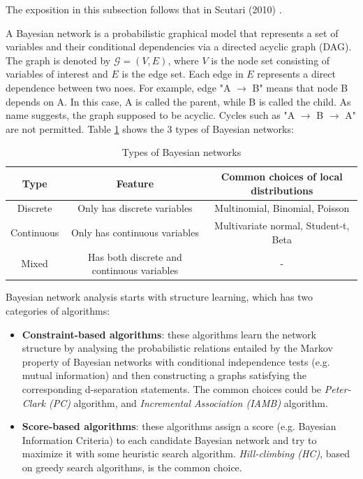 \documentclass[11pt,twoside]{article}
\numberwithin{Theorem}{section}
\numberwithin{Definition}{section}
\numberwithin{Lemma}{section}
\numberwithin{Algorithm}{section}
\numberwithin{equation}{section}
\begin{document}
The exposition in this subsection follows that in Scutari (2010) \cite{scutari2010learning}.

A Bayesian network is a probabilistic graphical model that represents a set of variables and their conditional dependencies via a directed acyclic graph (DAG). The graph is denoted by $\mathcal{G} = (V,E)$, where $V$ is the node set consisting of variables of interest and $E$ is the edge set. Each edge in $E$ represents a direct dependence between two noes.  For example, edge "A $\rightarrow$ B" means that node B depends on A. In this case, A is called the parent, while B is called the child. As name suggests, the graph supposed to be acyclic. Cycles such as "A $\rightarrow$ B $\rightarrow$ A" are not permitted. Table \ref{tab:bn_type} shows the 3 types of Bayesian networks:

\begin{table}[!h]
	\centering
	\begin{tabular}{|c|c|c|}
		\hline
		Type & Feature & Common choices of local distributions \\
		\hline
		Discrete & Only has discrete variables & Multinomial, Binomial, Poisson \\
		Continuous & Only has continuous variables & Multivariate normal, Student-t, Beta \\
		Mixed & Has both discrete and continuous variables & - \\
		\hline
	\end{tabular}
	\caption{Types of Bayesian networks}
	\label{tab:bn_type} 
\end{table}

Bayesian network analysis starts with structure learning, which has two categories of algorithms:
\begin{itemize}

\item \textbf{Constraint-based algorithms}: these algorithms learn the network structure by analysing the probabilistic relations entailed by the Markov property of Bayesian networks with conditional independence tests (e.g. mutual information) and then constructing a graphs satisfying the corresponding d-separation statements. The common choices could be \emph{Peter-Clark (PC)} algorithm, and \emph{Incremental Association (IAMB)} algorithm.

\item \textbf{Score-based algorithms}: these algorithms assign a score (e.g. Bayesian Information Criteria) to each candidate Bayesian network and try to maximize it with some heuristic search algorithm. \emph{Hill-climbing (HC)}, based on greedy search algorithms, is the common choice.

\end{itemize}
\end{document}
